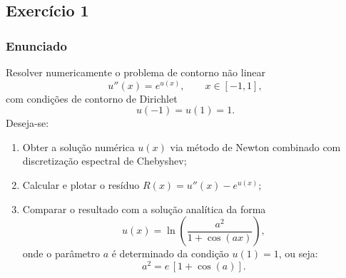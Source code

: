 \documentclass[12pt,a4paper]{article}
\begin{document}




\newpage

\subsection{Exercício 1}

\subsubsection{Enunciado}
Resolver numericamente o problema de contorno não linear
\begin{equation}
u''(x) = e^{u(x)}, \qquad x \in [-1,1],
\end{equation}
com condições de contorno de Dirichlet
\begin{equation}
u(-1) = u(1) = 1.
\end{equation}
Deseja-se:
\begin{enumerate}
    \item Obter a solução numérica $u(x)$ via método de Newton combinado com discretização espectral de Chebyshev;
    \item Calcular e plotar o resíduo $R(x)=u''(x)-e^{u(x)}$;
    \item Comparar o resultado com a solução analítica da forma
    \begin{equation}
        u(x) = \ln\!\left(\frac{a^2}{1+\cos(a x)}\right),
    \end{equation}
    onde o parâmetro $a$ é determinado da condição $u(1)=1$, ou seja:
    \begin{equation}
        a^2 = e\,[1+\cos(a)].
    \end{equation}
\end{enumerate}
\end{document}
